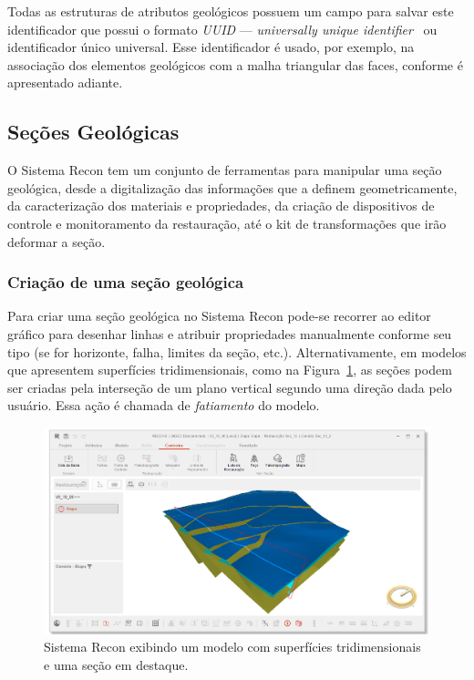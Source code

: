 Todas as estruturas de atributos geológicos possuem um campo para salvar este identificador que possui o formato \textit{UUID} --- \textit{universally unique identifier}~\cite{UUID} ou identificador único universal. Esse identificador é usado, por exemplo, na associação dos elementos geológicos com a malha triangular das faces, conforme é apresentado adiante.

\subsection{Seções Geológicas} %

O Sistema Recon tem um conjunto de ferramentas para manipular uma seção geológica, desde a digitalização das informações que a definem geometricamente, da caracterização dos materiais e propriedades, da criação de dispositivos de controle e monitoramento da restauração, até o kit de transformações que irão deformar a seção.

\subsubsection{Criação de uma seção geológica}\label{item-section-creation}

Para criar uma seção geológica no Sistema Recon pode-se recorrer ao editor gráfico para desenhar linhas e atribuir propriedades manualmente conforme seu tipo (se for horizonte, falha, limites da seção, etc.). Alternativamente, em modelos que apresentem superfícies tridimensionais, como na Figura~\ref{fig-recon-1}, as seções podem ser criadas pela interseção de um plano vertical segundo uma direção dada pelo usuário. Essa ação é chamada de \textit{fatiamento} do modelo.

\begin{figure} [H]
  \begin{center}
    \includegraphics[width=\textwidth]{images/fig-recon-1}
    \caption{Sistema Recon exibindo um modelo com superfícies tridimensionais e uma seção em destaque.}\label{fig-recon-1}
  \end{center}
\end{figure}

